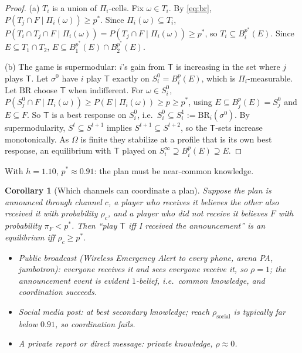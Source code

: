 \documentclass[11pt]{article}
\newtheorem{corollary}{Corollary}
\theoremstyle{definition}
\theoremstyle{remark}
\newcommand{\1}{\mathbf{1}}
\newcommand{\Tog}{\mathsf{T}}
\begin{document}
\begin{proof}
(a) $T_i$ is a union of $\Pi_i$-cells. Fix $\omega\in T_i$. By
\eqref{eq:br}, $P(T_j\cap F\mid\Pi_i(\omega))\ge p^*$. Since
$\Pi_i(\omega)\subseteq T_i$, $P(T_i\cap T_j\cap F\mid\Pi_i(\omega))
=P(T_j\cap F\mid\Pi_i(\omega))\ge p^*$, so $T_i\subseteq B_i^{p^*}(E)$.
Since $E\subseteq T_1\cap T_2$, $E\subseteq B_1^{p^*}(E)\cap B_2^{p^*}(E)$.

(b) The game is supermodular: $i$'s gain from $\Tog$ is increasing in the
set where $j$ plays $\Tog$. Let $\sigma^0$ have $i$ play $\Tog$ exactly on
$S_i^0=B_i^p(E)$, which is $\Pi_i$-measurable. Let $\mathrm{BR}$ choose
$\Tog$ when indifferent. For $\omega\in S_i^0$,
$P(S_j^0\cap F\mid\Pi_i(\omega))\ge P(E\mid\Pi_i(\omega))\ge p\ge p^*$,
using $E\subseteq B_j^p(E)=S_j^0$ and $E\subseteq F$. So $\Tog$ is a best
response on $S_i^0$, i.e.\ $S_i^0\subseteq S_i^1:=\mathrm{BR}_i(\sigma^0)$.
By supermodularity, $S^{t}\subseteq S^{t+1}$ implies
$S^{t+1}\subseteq S^{t+2}$, so the $\Tog$-sets increase monotonically. As
$\Omega$ is finite they stabilize at a profile that is its own best
response, an equilibrium with $\Tog$ played on $S_i^\infty\supseteq
B_i^p(E)\supseteq E$.
\end{proof}

With $h=1.10$, $p^*\approx0.91$: the plan must be near-common knowledge.

\begin{corollary}[Which channels can coordinate a plan]\label{cor:channels}
Suppose the plan is announced through channel $c$, a player who receives it
believes the other also received it with probability $\rho_c$, and a player
who did not receive it believes $F$ with probability $\pi_F<p^*$. Then
``play $\Tog$ iff I received the announcement'' is an equilibrium iff
$\rho_c\ge p^*$.
\begin{itemize}
\item Public broadcast (Wireless Emergency Alert to every phone, arena PA,
jumbotron): everyone receives it and sees everyone receive it, so
$\rho=1$; the announcement event is evident $1$-belief, i.e.\ common
knowledge, and coordination succeeds.
\item Social media post: at best secondary knowledge; reach
$\rho_{\text{social}}$ is typically far below $0.91$, so coordination fails.
\item A private report or direct message: private knowledge, $\rho\approx0$.
\end{itemize}
\end{corollary}
\end{document}
